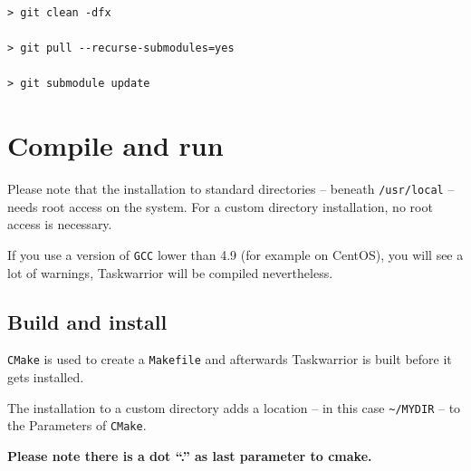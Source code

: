 \documentclass[DIV=12,fontsize=12pt,parskip=half,paper=portrait,%
               headheight=61pt,headinclude=yes,%
               footheight=15pt,footinclude=no]{scrartcl}
\begin{document}
\begin{lstlisting}
> git clean -dfx

> git pull --recurse-submodules=yes

> git submodule update\end{lstlisting}

\section{Compile and run}

Please note that the installation to standard directories -- beneath \texttt{/usr/local} -- needs root access on the system. For a custom directory installation, no root access is necessary.

If you use a version of \texttt{GCC} lower than 4.9 (for example on CentOS), you will see a lot of warnings, Taskwarrior will be compiled nevertheless.

\subsection{Build and install}

\texttt{CMake} is used to create a \texttt{Makefile} and afterwards Taskwarrior is built before it gets installed.

The installation to a custom directory adds a location -- in this case \texttt{\textasciitilde/MYDIR} -- to the Parameters of \texttt{CMake}.

\textbf{Please note there is a dot ``.'' as last parameter to cmake.}
\end{document}

